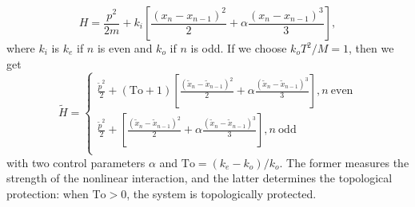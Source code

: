 \documentclass[%
 amsmath,amssymb,
 aps,
 prl,
 twocolumn,
]{revtex4-2}
\begin{document}
\begin{equation}
    H = \frac{p^2}{2m} + k_i\left[\frac{(x_n - x_{n-1})^2}{2} + \alpha \frac{(x_n - x_{n-1})^3}{3}\right],
\end{equation}
where $k_i$ is $k_e$ if $n$ is even and $k_o$ if $n$ is odd.
If we choose $k_o T^2/M = 1$, then we get
\begin{equation}
    \tilde{H} = 
    \begin{cases}
    \frac{\tilde{p}^2}{2} + (\mathrm{To}+1)\left[\frac{(\tilde{x}_n - \tilde{x}_{n-1})^2}{2} + \alpha \frac{(\tilde{x}_n - \tilde{x}_{n-1})^3}{3}\right],  n\ \text{even}\\
    \frac{\tilde{p}^2}{2} + \left[\frac{(\tilde{x}_n - \tilde{x}_{n-1})^2}{2} + \alpha \frac{(\tilde{x}_n - \tilde{x}_{n-1})^3}{3}\right],  n\ \text{odd}\\
    \end{cases}
\end{equation}
with two control parameters $\alpha$ and $\mathrm{To} = (k_e - k_o)/k_o$. The former measures the strength of the nonlinear interaction, and the latter determines the topological protection: when $\mathrm{To} > 0$, the system is topologically protected.
\end{document}

